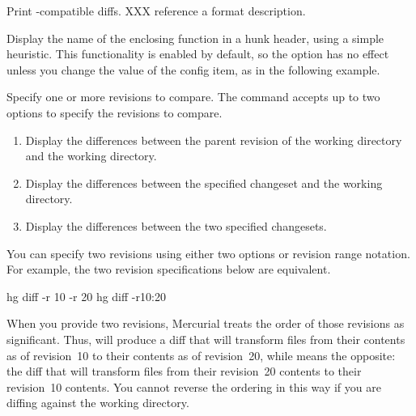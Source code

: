 
Print -compatible diffs.  XXX reference a format
description.


Display the name of the enclosing function in a hunk header, using a
simple heuristic.  This functionality is enabled by default, so the
 option has no effect unless you change the value of
the  config item, as in the following example.


Specify one or more revisions to compare.  The  command
accepts up to two  options to specify the revisions to
compare.

\begin{enumerate}
\setcounter{enumi}{0}
\item Display the differences between the parent revision of the
  working directory and the working directory.
\item Display the differences between the specified changeset and the
  working directory.
\item Display the differences between the two specified changesets.
\end{enumerate}

You can specify two revisions using either two 
options or revision range notation.  For example, the two revision
specifications below are equivalent.
\begin{codesample2}
  hg diff -r 10 -r 20
  hg diff -r10:20
\end{codesample2}

When you provide two revisions, Mercurial treats the order of those
revisions as significant.  Thus,  will
produce a diff that will transform files from their contents as of
revision~10 to their contents as of revision~20, while
 means the opposite: the diff that will
transform files from their revision~20 contents to their revision~10
contents.  You cannot reverse the ordering in this way if you are
diffing against the working directory.



